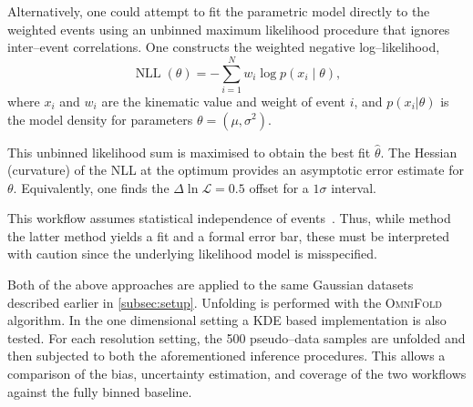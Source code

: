         Alternatively, one could attempt to fit the parametric model directly to the weighted events using an unbinned maximum likelihood procedure that ignores inter--event correlations.
        One constructs the weighted negative log--likelihood,
        \[
            \operatorname{NLL}(\theta) = -\sum_{i=1}^N w_i \log p(x_i \mid \theta),
        \]
        where $x_i$ and $w_i$ are the kinematic value and weight of event $i$, and $p(x_i|\theta)$ is the model density for parameters $\theta=(\mu,\sigma^2)$.
        
        This unbinned likelihood sum is maximised to obtain the best fit $\hat\theta$.
        The Hessian (curvature) of the NLL at the optimum provides an asymptotic error estimate for $\theta$.
        Equivalently, one finds the $\Delta\ln\mathcal L=0.5$ offset for a $1\sigma$ interval.
        
        This workflow assumes statistical independence of events~\cite{cowan_survey_2002, Blobel:2011fih, Blobel2013Unfolding}.
        Thus, while method the latter method yields a fit and a formal error bar, these must be interpreted with caution since the underlying likelihood model is misspecified.
    
        Both of the above approaches are applied to the same Gaussian datasets described earlier in \cref{subsec:setup}.
        Unfolding is performed with the \textsc{OmniFold} algorithm.
        In the one dimensional setting a KDE based implementation is also tested.
        For each resolution setting, the 500 pseudo--data samples are unfolded and then subjected to both the aforementioned inference procedures.
        This allows a comparison of the bias, uncertainty estimation, and coverage of the two workflows against the fully binned baseline.

